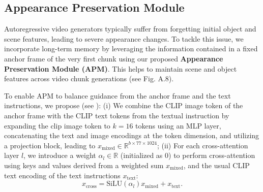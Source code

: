 \subsection{Appearance Preservation Module}
\label{ssec:apm}
Autoregressive video generators typically suffer from forgetting initial object and  scene features, leading to severe appearance changes. 
To tackle this issue, we incorporate long-term memory by leveraging the information contained in a fixed anchor frame of the very first chunk using our proposed \textbf{Appearance Preservation Module (APM)}.  This helps to maintain scene and object features across video chunk generations
(see Fig. \textcolor{linkblue}{A.8}).

To enable APM to balance guidance from the anchor frame and the text instructions, we propose (see ): (i) We combine the CLIP \cite{CLIP_paper} image token of the anchor frame with the CLIP text tokens from the textual instruction by expanding the clip image token to $k=16$ tokens using an MLP layer, concatenating the text and image encodings at the token dimension, and utilizing a projection block, leading to $x_{\mathrm{mixed}} \in \mathbb{R}^{b \times 77 \times 1024}$; (ii) For each cross-attention layer $l$, we introduce a weight $\alpha_{l} \in \mathbb{R}$ (initialized as $0$) to perform cross-attention using keys and values derived from a weighted sum $x_{\mathrm{mixed}}$, and the usual CLIP text encoding of the text instructions $x_{\mathrm{text}}$: 
\begin{equation}
    x_{\mathrm{cross}} = \mathrm{SiLU}(\alpha_{l}) x_{\mathrm{mixed}} + x_{\mathrm{text}}.
\end{equation}



